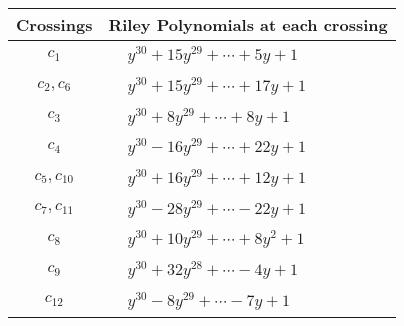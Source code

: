 \documentclass[1p]{elsarticle_modified}
\theoremstyle{definition}
\begin{document}
\begin{tabular}{m{50pt}|m{274pt}}
Crossings & \hspace{64pt}Riley Polynomials at each crossing \\
\hline $$\begin{aligned}c_{1}\end{aligned}$$&$\begin{aligned}
&y^{30}+15 y^{29}+\cdots+5 y+1
\end{aligned}$\\
\hline $$\begin{aligned}c_{2},c_{6}\end{aligned}$$&$\begin{aligned}
&y^{30}+15 y^{29}+\cdots+17 y+1
\end{aligned}$\\
\hline $$\begin{aligned}c_{3}\end{aligned}$$&$\begin{aligned}
&y^{30}+8 y^{29}+\cdots+8 y+1
\end{aligned}$\\
\hline $$\begin{aligned}c_{4}\end{aligned}$$&$\begin{aligned}
&y^{30}-16 y^{29}+\cdots+22 y+1
\end{aligned}$\\
\hline $$\begin{aligned}c_{5},c_{10}\end{aligned}$$&$\begin{aligned}
&y^{30}+16 y^{29}+\cdots+12 y+1
\end{aligned}$\\
\hline $$\begin{aligned}c_{7},c_{11}\end{aligned}$$&$\begin{aligned}
&y^{30}-28 y^{29}+\cdots-22 y+1
\end{aligned}$\\
\hline $$\begin{aligned}c_{8}\end{aligned}$$&$\begin{aligned}
&y^{30}+10 y^{29}+\cdots+8 y^2+1
\end{aligned}$\\
\hline $$\begin{aligned}c_{9}\end{aligned}$$&$\begin{aligned}
&y^{30}+32 y^{28}+\cdots-4 y+1
\end{aligned}$\\
\hline $$\begin{aligned}c_{12}\end{aligned}$$&$\begin{aligned}
&y^{30}-8 y^{29}+\cdots-7 y+1
\end{aligned}$\\
\hline
\end{tabular}\\~\\
\end{document}
